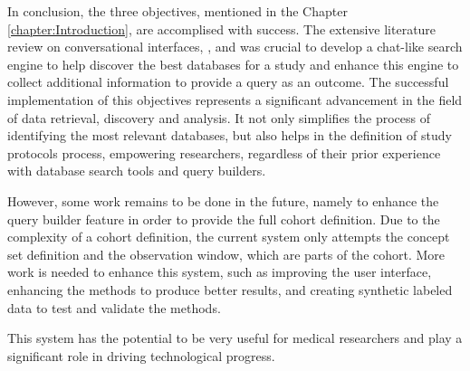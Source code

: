 In conclusion, the three objectives, mentioned in the Chapter \ref{chapter:Introduction}, are accomplised with success. The extensive literature review on conversational interfaces, {\nlp}, and {\ir} was crucial to develop a chat-like search engine to help discover the best databases for a study and enhance this engine to collect additional information to provide a query as an outcome. The successful implementation of this objectives represents a significant advancement in the field of data retrieval, discovery and analysis. It not only simplifies the process of identifying the most relevant databases, but also helps in the definition of study protocols process, empowering researchers, regardless of their prior experience with database search tools and query builders.

However, some work remains to be done in the future, namely to enhance the query builder feature in order to provide the full cohort definition. Due to the complexity of a cohort definition, the current system only attempts the concept set definition and the observation window, which are parts of the cohort. More work is needed to enhance this system, such as improving the user interface, enhancing the {\ir} methods to produce better results, and creating synthetic labeled data to test and validate the {\ir} methods.

This system has the potential to be very useful for medical researchers and play a significant role in driving technological progress.
 
